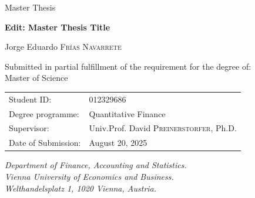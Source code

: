 \documentclass[
  12pt,
  a4paper,
  openany]{scrbook}
\begin{document}
\begin{center}
    \large Master Thesis \\
    \vspace{1cm}

    \textbf{\huge Edit: Master Thesis Title} \\
    \vspace{0.5cm}

        \LARGE Jorge Eduardo \textsc{Frías Navarrete} \\
    \vspace{0.5cm}
        \vspace{2cm}
    
    \normalsize Submitted in partial fulfillment of the requirement for the degree of: \\
    \LARGE Master of Science \\
\vspace{2cm}

\normalsize
    \begin{tabular}{ll}
        Student ID: & 012329686 \\
        Degree programme: & Quantitative Finance \\
        Supervisor: & Univ.Prof. David \textsc{Preinerstorfer}, Ph.D. \\
        Date of Submission: & August 20, 2025
    \end{tabular}
    \vspace{2cm}
    
    \textit{
      Department of Finance, Accounting and Statistics. \\
      Vienna University of Economics and Business. \\
      Welthandelsplatz 1, 1020 Vienna, Austria.
    }

\end{center}

\restoregeometry


% 
\end{document}
